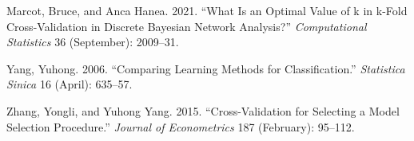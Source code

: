 \documentclass[
  12pt,
]{article}
\newlength{\cslhangindent}
\newlength{\cslentryspacingunit} %
\newenvironment{CSLReferences}[2] %
 {%
  \setlength{\parindent}{0pt}
  \ifodd #1
  \let\oldpar\par
  \def\par{\hangindent=\cslhangindent\oldpar}
  \fi
  \setlength{\parskip}{#2\cslentryspacingunit}
 }%
 {}
\begin{document}
\begin{CSLReferences}{1}{0}
\leavevmode{}%
Marcot, Bruce, and Anca Hanea. 2021. {``What Is an Optimal Value of k in
k-Fold Cross-Validation in Discrete Bayesian Network Analysis?''}
\emph{Computational Statistics} 36 (September): 2009--31.

\leavevmode{}%
Yang, Yuhong. 2006. {``Comparing Learning Methods for Classification.''}
\emph{Statistica Sinica} 16 (April): 635--57.

\leavevmode{}%
Zhang, Yongli, and Yuhong Yang. 2015. {``Cross-Validation for Selecting
a Model Selection Procedure.''} \emph{Journal of Econometrics} 187
(February): 95--112.

\end{CSLReferences}
\end{document}
